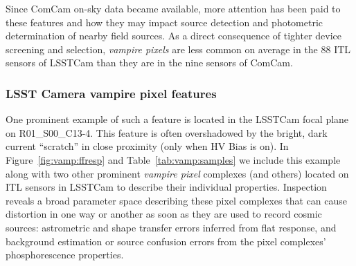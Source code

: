 Since ComCam on-sky data became available, more attention has been paid to these features and how they may impact source detection and photometric determination of nearby field sources. As a direct consequence of tighter device screening and selection, {\it vampire pixels} are less common on average in the 88 ITL sensors of LSSTCam than they are in the nine sensors of ComCam.


\subsubsection{LSST Camera vampire pixel features}\label{lsstcam-vampire-pixel-features}

One prominent example of such a feature is located in the LSSTCam focal plane on R01\_S00\_C13-4. This feature is often overshadowed by the bright, dark current ``scratch'' in close proximity (only when HV Bias is on). In Figure~\ref{fig:vamp:ffresp} and Table~\ref{tab:vamp:samples} we include this example along with two other prominent {\it vampire pixel} complexes (and others) located on ITL sensors in LSSTCam to describe their individual properties. Inspection reveals a broad parameter space describing these pixel complexes that can cause distortion in one way or another as soon as they are used to record cosmic sources: astrometric and shape transfer errors inferred from flat response, and background estimation or source confusion errors from the pixel complexes' phosphorescence properties.




